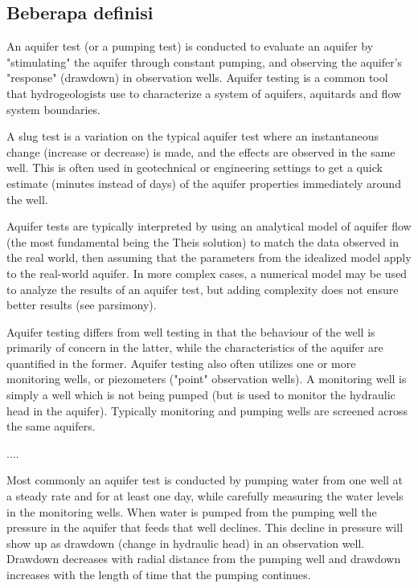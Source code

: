\subsection{Beberapa definisi}

An aquifer test (or a pumping test) is conducted to evaluate an aquifer by "stimulating" the aquifer through constant pumping, and observing the aquifer's "response" (drawdown) in observation wells. Aquifer testing is a common tool that hydrogeologists use to characterize a system of aquifers, aquitards and flow system boundaries.

A slug test is a variation on the typical aquifer test where an instantaneous change (increase or decrease) is made, and the effects are observed in the same well. This is often used in geotechnical or engineering settings to get a quick estimate (minutes instead of days) of the aquifer properties immediately around the well.

Aquifer tests are typically interpreted by using an analytical model of aquifer flow (the most fundamental being the Theis solution) to match the data observed in the real world, then assuming that the parameters from the idealized model apply to the real-world aquifer. In more complex cases, a numerical model may be used to analyze the results of an aquifer test, but adding complexity does not ensure better results (see parsimony).

Aquifer testing differs from well testing in that the behaviour of the well is primarily of concern in the latter, while the characteristics of the aquifer are quantified in the former. Aquifer testing also often utilizes one or more monitoring wells, or piezometers ("point" observation wells). A monitoring well is simply a well which is not being pumped (but is used to monitor the hydraulic head in the aquifer). Typically monitoring and pumping wells are screened across the same aquifers.

....

Most commonly an aquifer test is conducted by pumping water from one well at a steady rate and for at least one day, while carefully measuring the water levels in the monitoring wells. When water is pumped from the pumping well the pressure in the aquifer that feeds that well declines. This decline in pressure will show up as drawdown (change in hydraulic head) in an observation well. Drawdown decreases with radial distance from the pumping well and drawdown increases with the length of time that the pumping continues.

